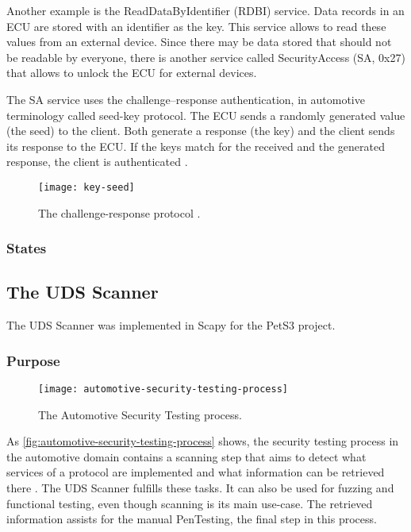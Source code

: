 Another example is the ReadDataByIdentifier (RDBI) service. Data records in an ECU are stored with an identifier as the key. This service allows to read these values from an external device. Since there may be data stored that should not be readable by everyone, there is another service called SecurityAccess (SA, 0x27) that allows to unlock the ECU for external devices.

The SA service uses the challenge–response authentication, in automotive terminology called seed-key protocol. The ECU sends a randomly generated value (the seed) to the client. Both generate a response (the key) and the client sends its response to the ECU. If the keys match for the received and the generated response, the client is authenticated \cite{Herrewegen2018, iso14229}.

\begin{figure}[h]
    \centering
    \texttt{[image: key-seed]}
    \caption{The challenge-response protocol \cite{Herrewegen2018}.}
    \label{fig:key-seed}
\end{figure}

\subsubsection{States}


\subsection{The UDS Scanner}

The UDS Scanner was implemented in Scapy for the PetS3 project.

\subsubsection{Purpose}

\begin{figure}[h]
    \centering
    \texttt{[image: automotive-security-testing-process]}
    \caption{The Automotive Security Testing process.}
    \label{fig:automotive-security-testing-process}
\end{figure}

As \autoref{fig:automotive-security-testing-process} shows, the security testing process in the automotive domain contains a scanning step that aims to detect what services of a protocol are implemented and what information can be retrieved there \cite{Bayer2015}. The UDS Scanner fulfills these tasks. It can also be used for fuzzing and functional testing, even though scanning is its main use-case. The retrieved information assists for the manual PenTesting, the final step in this process.

